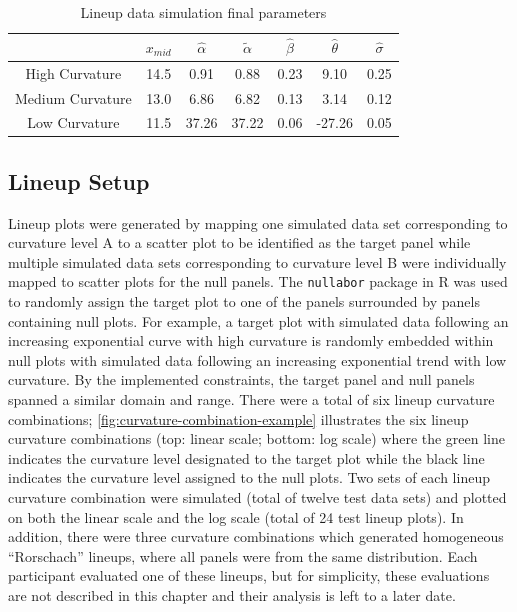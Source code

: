 \documentclass[12pt]{article}
\begin{document}
\begin{table}

\caption{\label{tab:parameter-data}Lineup data simulation final parameters}
\centering
\begin{tabular}[t]{ccccccc}
\toprule
 & $x_{mid}$ & $\hat\alpha$ & $\tilde\alpha$ & $\hat\beta$ & $\hat\theta$ & $\hat\sigma$\\
\midrule
High Curvature & 14.5 & 0.91 & 0.88 & 0.23 & 9.10 & 0.25\\
Medium Curvature & 13.0 & 6.86 & 6.82 & 0.13 & 3.14 & 0.12\\
Low Curvature & 11.5 & 37.26 & 37.22 & 0.06 & -27.26 & 0.05\\
\bottomrule
\end{tabular}
\end{table}

\hypertarget{lineup-setup}{%
\subsection{Lineup Setup}\label{lineup-setup}}

Lineup plots were generated by mapping one simulated data set
corresponding to curvature level A to a scatter plot to be identified as
the target panel while multiple simulated data sets corresponding to
curvature level B were individually mapped to scatter plots for the null
panels. The \texttt{nullabor} package in R \citep{nullabor} was used to
randomly assign the target plot to one of the panels surrounded by
panels containing null plots. For example, a target plot with simulated
data following an increasing exponential curve with high curvature is
randomly embedded within null plots with simulated data following an
increasing exponential trend with low curvature. By the implemented
constraints, the target panel and null panels spanned a similar domain
and range. There were a total of six lineup curvature combinations;
\cref{fig:curvature-combination-example} illustrates the six lineup
curvature combinations (top: linear scale; bottom: log scale) where the
green line indicates the curvature level designated to the target plot
while the black line indicates the curvature level assigned to the null
plots. Two sets of each lineup curvature combination were simulated
(total of twelve test data sets) and plotted on both the linear scale
and the log scale (total of 24 test lineup plots). In addition, there
were three curvature combinations which generated homogeneous
``Rorschach'' lineups, where all panels were from the same distribution.
Each participant evaluated one of these lineups, but for simplicity,
these evaluations are not described in this chapter and their analysis
is left to a later date.
\end{document}
